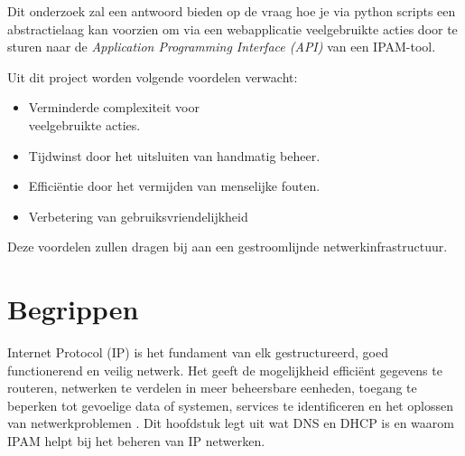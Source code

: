 \documentclass{hogent-article}
\begin{document}
Dit onderzoek zal een antwoord bieden op de vraag hoe je via python scripts een abstractielaag kan voorzien om via een webapplicatie veelgebruikte acties door te sturen naar de \textit{Application Programming Interface (API)} van een IPAM-tool. 

Uit dit project worden volgende voordelen verwacht:
\begin{itemize}
    \item Verminderde complexiteit voor \\veelgebruikte acties.
    \item Tijdwinst door het uitsluiten van handmatig beheer.
    \item Efficiëntie door het vermijden van menselijke fouten.
    \item Verbetering van gebruiksvriendelijkheid
\end{itemize}
Deze voordelen zullen dragen bij aan een gestroomlijnde netwerkinfrastructuur.



\section{Begrippen}
\label{sec:begrippen}
Internet Protocol (IP) is het fundament van elk gestructureerd, goed functionerend en veilig netwerk. Het geeft de mogelijkheid efficiënt gegevens te routeren, netwerken te verdelen in meer beheersbare eenheden, toegang te beperken tot gevoelige data of systemen, services te identificeren en het oplossen van netwerkproblemen \autocite{Postel1981}. Dit hoofdstuk legt uit wat DNS en DHCP is en waarom IPAM helpt bij het beheren van IP netwerken. 
\end{document}
